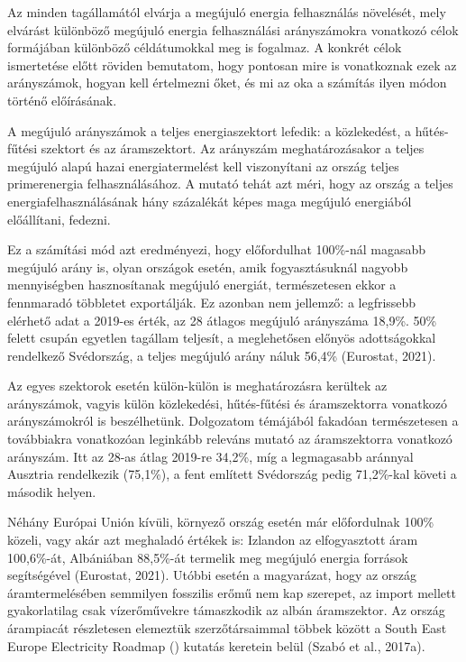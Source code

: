 \documentclass[twoside, magyar, showtrims]{corvinusphd}
\theoremstyle{plain}
\theoremstyle{remark}
\theoremstyle{definition}
\begin{document}
Az  minden tagállamától elvárja a megújuló energia
felhasználás növelését, mely elvárást különböző
megújuló energia felhasználási arányszámokra
vonatkozó célok formájában különböző céldátumokkal
meg is fogalmaz. A konkrét célok ismertetése előtt röviden
bemutatom, hogy pontosan mire is
vonatkoznak ezek az arányszámok,
hogyan kell értelmezni őket, és mi az
oka a számítás ilyen módon történő előírásának.

A megújuló arányszámok a teljes energiaszektort lefedik: 
a közlekedést, a hűtés-fűtési szektort és az áramszektort.
Az arányszám meghatározásakor a teljes megújuló alapú
hazai energiatermelést kell viszonyítani az ország
teljes primerenergia felhasználásához. A mutató tehát azt méri,
hogy az ország a teljes energiafelhasználásának hány százalékát
képes maga megújuló energiából előállítani, fedezni.

Ez a számítási mód azt eredményezi, hogy
előfordulhat 100\%-nál magasabb
megújuló arány is, olyan országok esetén,
amik fogyasztásuknál nagyobb mennyiségben
hasznosítanak megújuló energiát,
természetesen ekkor a fennmaradó többletet exportálják.
Ez azonban nem jellemző: a legfrissebb elérhető adat
a 2019-es érték, az 28 átlagos megújuló arányszáma
18,9\%. 50\% felett csupán egyetlen tagállam teljesít,
a meglehetősen előnyös adottságokkal rendelkező
Svédország, a teljes megújuló arány náluk 56,4\% (Eurostat, 2021).

Az egyes szektorok esetén külön-külön is meghatározásra kerültek
az arányszámok, vagyis külön közlekedési, hűtés-fűtési
és áramszektorra vonatkozó arányszámokról is beszélhetünk.
Dolgozatom témájából fakadóan természetesen a
továbbiakra vonatkozóan leginkább releváns mutató
az áramszektorra vonatkozó arányszám. Itt az 28-as átlag
2019-re 34,2\%, míg a legmagasabb aránnyal
Ausztria rendelkezik (75,1\%), a fent említett Svédország
pedig 71,2\%-kal követi a második helyen.

Néhány Európai Unión kívüli, környező ország esetén már előfordulnak
100\% közeli, vagy akár azt meghaladó értékek is:
Izlandon az elfogyasztott áram 100,6\%-át,
Albániában 88,5\%-át termelik meg megújuló energia források
segítségével (Eurostat, 2021). Utóbbi esetén a magyarázat, hogy
az ország áramtermelésében semmilyen
fosszilis erőmű nem kap szerepet, az import
mellett gyakorlatilag csak vízerőművekre támaszkodik
az albán áramszektor. Az ország árampiacát részletesen elemeztük
szerzőtársaimmal többek között a South East Europe Electricity Roadmap
() kutatás keretein belül (Szabó et al., 2017a). 
\end{document}
